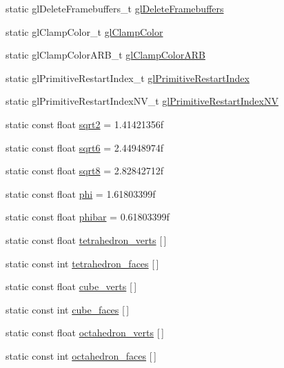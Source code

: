 \begin{DoxyCompactItemize}
\item 
static gl\+Delete\+Framebuffers\+\_\+t \hyperlink{namespacetrimesh_adb592b8b605c335d4626bed7524765d7}{gl\+Delete\+Framebuffers}
\item 
static gl\+Clamp\+Color\+\_\+t \hyperlink{namespacetrimesh_aeec8d56590fc0f6d676bb6361eb4d3aa}{gl\+Clamp\+Color}
\item 
static gl\+Clamp\+Color\+A\+R\+B\+\_\+t \hyperlink{namespacetrimesh_a0333f6dd0714963a37318634e4a34177}{gl\+Clamp\+Color\+A\+RB}
\item 
static gl\+Primitive\+Restart\+Index\+\_\+t \hyperlink{namespacetrimesh_a5bdfe3ad160df10815c3e230727a6098}{gl\+Primitive\+Restart\+Index}
\item 
static gl\+Primitive\+Restart\+Index\+N\+V\+\_\+t \hyperlink{namespacetrimesh_a44c58825ddfe4b914854d57167946bbc}{gl\+Primitive\+Restart\+Index\+NV}
\item 
static const float \hyperlink{namespacetrimesh_a21b7083db6f31938db0a1978b55f9899}{sqrt2} = 1.\+41421356f
\item 
static const float \hyperlink{namespacetrimesh_a3173b214bdbe05cf868a3d263a3cf29c}{sqrt6} = 2.\+44948974f
\item 
static const float \hyperlink{namespacetrimesh_a8b4b9b07d9f3a19420d9c1c642d9c514}{sqrt8} = 2.\+82842712f
\item 
static const float \hyperlink{namespacetrimesh_ade4acd999d6155e3cf3d58ce8b0a30d8}{phi} = 1.\+61803399f
\item 
static const float \hyperlink{namespacetrimesh_a9ba8d304fcf63c306b2716fbdba7fe38}{phibar} = 0.\+61803399f
\item 
static const float \hyperlink{namespacetrimesh_a4c2c632885208cd79c312e0be2cbbfc1}{tetrahedron\+\_\+verts} \mbox{[}$\,$\mbox{]}
\item 
static const int \hyperlink{namespacetrimesh_a7dee6a1de71cde98b34afd14d5b87bb8}{tetrahedron\+\_\+faces} \mbox{[}$\,$\mbox{]}
\item 
static const float \hyperlink{namespacetrimesh_a2c744a9278fc2a215d1331a113966194}{cube\+\_\+verts} \mbox{[}$\,$\mbox{]}
\item 
static const int \hyperlink{namespacetrimesh_ab471f8ebb68fbf1b537fa0a1bcdd8ede}{cube\+\_\+faces} \mbox{[}$\,$\mbox{]}
\item 
static const float \hyperlink{namespacetrimesh_a06c2c3733cfa4ce507f15a1abd7148e7}{octahedron\+\_\+verts} \mbox{[}$\,$\mbox{]}
\item 
static const int \hyperlink{namespacetrimesh_a52acb89d1dfc13df3e0d82babb32172e}{octahedron\+\_\+faces} \mbox{[}$\,$\mbox{]}

\end{DoxyCompactItemize}
